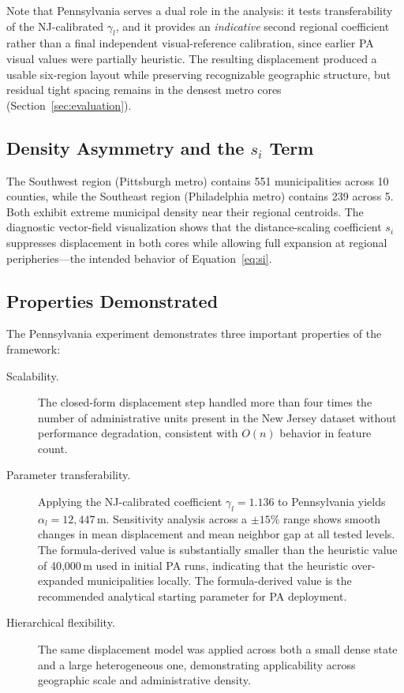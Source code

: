 \documentclass[12pt, a4paper]{article}
\numberwithin{equation}{section}
\begin{document}
Note that Pennsylvania serves a dual role in the analysis: it tests transferability of the NJ-calibrated $\gamma_l$, and it provides an \emph{indicative} second regional coefficient rather than a final independent visual-reference calibration, since earlier PA visual values were partially heuristic. The resulting displacement produced a usable six-region layout while preserving recognizable geographic structure, but residual tight spacing remains in the densest metro cores (Section~\ref{sec:evaluation}).

\subsection{Density Asymmetry and the $s_i$ Term}

The Southwest region (Pittsburgh metro) contains 551 municipalities across 10 counties, while the Southeast region (Philadelphia metro) contains 239 across 5. Both exhibit extreme municipal density near their regional centroids. The diagnostic vector-field visualization shows that the distance-scaling coefficient $s_i$ suppresses displacement in both cores while allowing full expansion at regional peripheries---the intended behavior of Equation~\eqref{eq:si}.

\subsection{Properties Demonstrated}

The Pennsylvania experiment demonstrates three important properties of the framework:

\begin{description}
  \item[Scalability.] The closed-form displacement step handled more than four times the number of administrative units present in the New Jersey dataset without performance degradation, consistent with $O(n)$ behavior in feature count.
  \item[Parameter transferability.] Applying the NJ-calibrated coefficient $\gamma_l = 1.136$ to Pennsylvania yields $\alpha_l = 12{,}447$\,m. Sensitivity analysis across a $\pm 15\%$ range shows smooth changes in mean displacement and mean neighbor gap at all tested levels. The formula-derived value is substantially smaller than the heuristic value of 40{,}000\,m used in initial PA runs, indicating that the heuristic over-expanded municipalities locally. The formula-derived value is the recommended analytical starting parameter for PA deployment.
  \item[Hierarchical flexibility.] The same displacement model was applied across both a small dense state and a large heterogeneous one, demonstrating applicability across geographic scale and administrative density.
\end{description}
\end{document}

